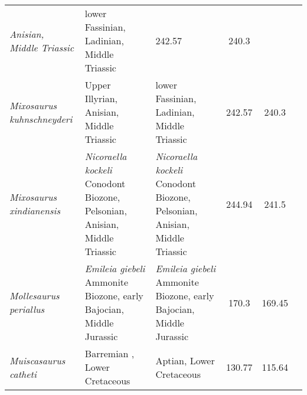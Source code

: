 \begin{longtabu}{>{\itshape}lXXSSl}
        Anisian, Middle Triassic
                                                             & lower Fassinian,
        Ladinian, Middle Triassic
                                                             & 242.57
                                                             & 240.3
                                                             &
                                                             \cite{Repossi1902ASISNMCSNM,McGowan2003HoP} \\        
	Mixosaurus kuhnschneyderi                            & Upper Illyrian,
        Anisian, Middle Triassic
                                                             & lower Fassinian,
        Ladinian, Middle Triassic
                                                             & 242.57
                                                             & 240.3
                                                             &
                                                             \cite{Brinkmann1998NJGPA} \\                  
	Mixosaurus xindianensis                              & \emph{Nicoraella
        kockeli} Conodont Biozone, Pelsonian, Anisian, Middle Triassic
                                                             & \emph{Nicoraella
        kockeli} Conodont Biozone, Pelsonian, Anisian, Middle Triassic
                                                             & 244.94
                                                             & 241.5
                                                             & \cite{Chen2010APS} \\                       
	Mollesaurus periallus                                & \emph{Emileia
        giebeli} Ammonite Biozone, early Bajocian, Middle Jurassic
                                                             & \emph{Emileia
        giebeli} Ammonite Biozone, early Bajocian, Middle Jurassic
                                                             & 170.3
                                                             & 169.45
                                                             &
                                                             \cite{Fernandez2014GM,Fernandez1999JP} \\    
	Muiscasaurus catheti                                 & Barremian , Lower
        Cretaceous
                                                             & Aptian, Lower
        Cretaceous
                                                             & 130.77
                                                             & 115.64

\end{longtabu}
